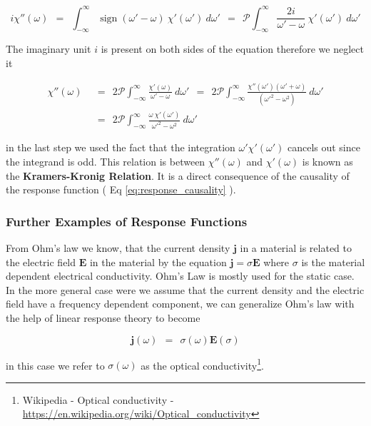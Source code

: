 \documentclass[10pt]{report}
\numberwithin{equation}{chapter}
\newcommand{\refEq}[1]{
  Eq  \ref{#1}
}
\newcommand{\vc}[1]{ %
  \mathbf{#1}
}
\DeclareMathOperator{\sign}{sign}
\newcommand{\princVal}{  %
  \mathcal{P}
}
\begin{document}
\begin{equation}
  i \chi''(\omega) ~~=~~ \int_{-\infty}^\infty \sign(\omega' - \omega)\ \chi'(\omega')\ d\omega' ~~=~~
  \princVal \int_{-\infty}^\infty \frac{2i}{\omega' - \omega}\ \chi'(\omega')\ d\omega'
\end{equation}

The imaginary unit $i$ is present on both sides of the equation therefore we neglect it 

\begin{align}
  \chi''(\omega) ~~& =~~ 2 \princVal \int_{-\infty}^\infty \frac{\chi'(\omega)}{\omega' - \omega}\ d\omega'
  ~~=~~ 2\princVal \int_{-\infty}^\infty \frac{\chi''(\omega')(\omega' + \omega)}{(\omega'^2 - \omega^2)}\ d\omega' \nonumber \\
  ~~& =~~ 2\princVal \int_{-\infty}^\infty \frac{\omega\ \chi'(\omega')}{\omega'^2-\omega^2}\ d\omega'
\end{align}

in the last step we used the fact that the integration $\omega' \chi'(\omega')$ cancels out since the integrand is odd. This relation is between $\chi''(\omega)$ and $\chi'(\omega)$ is known as the \textbf{Kramers-Kronig Relation}. It is a direct consequence of the causality of the response function (\refEq{eq:response_causality}). 


\subsubsection{Further Examples of Response Functions}

From Ohm's law we know, that the current density $\vc{j}$ in a material is related to the electric field $\vc{E}$ in the material by the equation $\vc{j} = \sigma \vc{E}$ where $\sigma$ is the material dependent electrical conductivity. Ohm's Law is mostly used for the static case. 
In the more general case were we assume that the current density and the electric field have a frequency dependent component, we can generalize Ohm's law with the help of linear response theory to become

\begin{equation}
  \vc{j}(\omega) ~~=~~ \sigma(\omega) \vc{E}(\sigma)
\end{equation}

in this case we refer to $\sigma(\omega)$ as the optical conductivity\footnote{Wikipedia - Optical conductivity - \url{https://en.wikipedia.org/wiki/Optical_conductivity}}.
\end{document}
